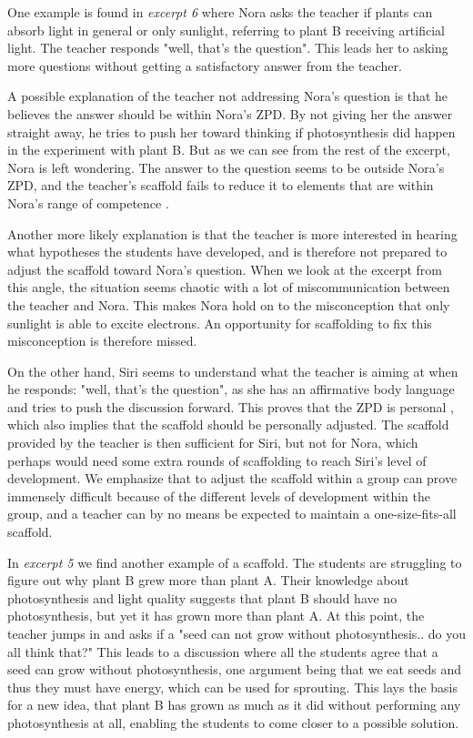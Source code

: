 One example is found in \emph{excerpt 6} where Nora asks the teacher if plants can absorb light in general or only sunlight, referring to plant B receiving artificial light. The teacher responds "well, that's the question". This leads her to asking more questions without getting a satisfactory answer from the teacher. 

A possible explanation of the teacher not addressing Nora's question is that he believes the answer should  be within Nora's ZPD. By not giving her the answer straight away, he tries to push her toward thinking if photosynthesis did happen in the experiment with plant B. But as we can see from the rest of the excerpt, Nora is left wondering. The answer to the question seems to be outside Nora's ZPD, and the teacher's scaffold fails to reduce it to elements that are within Nora's range of competence \citep{wood1976role}. 

Another more likely explanation is that the teacher is more interested in hearing what hypotheses the students have developed, and is therefore not prepared to adjust the scaffold toward Nora's question. When we look at the excerpt from this angle, the situation seems chaotic with a lot of miscommunication between the teacher and Nora. This makes Nora hold on to the misconception that only sunlight is able to excite electrons. An opportunity for scaffolding to fix this misconception is therefore missed.  

On the other hand, Siri seems to understand what the teacher is aiming at when he responds: "well, that's the question", as she has an affirmative body language and tries to push the discussion forward. This proves that the ZPD is personal \citep{vygotskiui1978mind}, which also implies that the scaffold should be personally adjusted. The scaffold provided by the teacher is then sufficient for Siri, but not for Nora, which perhaps would need some extra rounds of scaffolding to reach Siri's level of development. We emphasize that to adjust the scaffold within a group can prove immensely difficult because of the different levels of development within the group, and a teacher can by no means be expected to maintain a one-size-fits-all scaffold.

In \emph{excerpt 5} we find another example of a scaffold. The students are struggling to figure out why plant B grew more than plant A. Their knowledge about photosynthesis and light quality suggests that plant B should have no photosynthesis, but yet it has grown more than plant A. At this point, the teacher jumps in and asks if a "seed can not grow without photosynthesis.. do you all think that?" This leads to a discussion where all the students agree that a seed can grow without photosynthesis, one argument being that we eat seeds and thus they must have energy, which can be used for sprouting. This lays the basis for a new idea, that plant B has grown as much as it did without performing any photosynthesis at all, enabling the students to come closer to a possible solution. 

